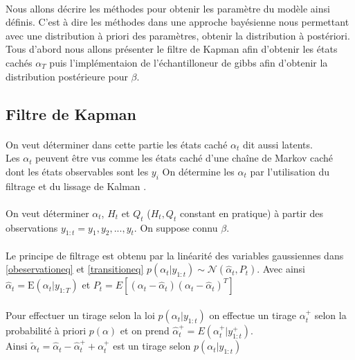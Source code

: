 \documentclass{article}
\theoremstyle{definition}
\theoremstyle{remark}
\begin{document}
{\paragraph{}
Nous allons décrire les méthodes pour obtenir les paramètre du modèle ainsi définis. C'est à dire les méthodes dans une approche bayésienne
nous permettant avec une distribution à priori des paramètres, obtenir la distribution à postériori.
Tous d'abord nous allons présenter le filtre de Kapman afin d'obtenir les états cachés $\alpha_T$ puis l'implémentaion de l'échantilloneur de gibbs afin
d'obtenir la distribution postérieure pour $\beta$.

\subsection{Filtre de Kapman}

\paragraph{}
On veut déterminer dans cette partie les états \og{} caché \fg $ \alpha_t$ dit aussi latents. \\
Les $\alpha_t$ peuvent être vus comme les états caché d'une chaîne de Markov caché dont les états observables sont les $y_i$
On détermine les $\alpha_t$ par l'utilisation du filtrage et du lissage de Kalman \cite{kalman}.

\paragraph{}
On veut déterminer $\alpha_t$, $H_t$ et $Q_t$ ($H_t,Q_t$ constant en pratique) à partir des
observations  $y_{1: t} = y_1, y_2, ..., y_t$.
On suppose connu $\beta$.
\paragraph{}
Le principe de filtrage est obtenu par la linéarité des variables gaussiennes dans \ref{obeservationeq} et \ref{transitioneq} 
$p(\alpha_{t} | y_{1: t}) \sim \mathcal{N}(\hat{\alpha}_{t}, P_t)$.
Avec ainsi $\hat{\alpha}_{t} = \mathrm{E}(\alpha_{t} | y_{1:T})$ et 
$P_{t} = E\left[\left(\alpha_{t}-\hat{\alpha}_{t}\right)\left(\alpha_{t}-\hat{\alpha}_{t}\right)^{T}\right]$
\paragraph{}
Pour effectuer un tirage selon la loi $p(\alpha_{t} | y_{1:t})$ on effectue un tirage $\alpha_t^+$ selon la probabilité 
à priori $p(\alpha)$ 
et on prend $\hat{\alpha}_t^+ = E(\alpha_{t}^+ | y_{1:t}^+)$. \\
Ainsi $\tilde{\alpha}_t = \hat{\alpha}_t - \hat{\alpha}_t^+ + \alpha_t^+$ est un tirage selon $p(\alpha_{t} | y_{1: t})$
}
\end{document}
